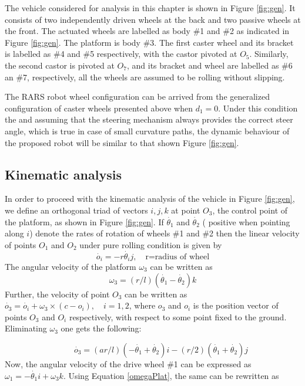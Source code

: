  The vehicle considered for analysis in this chapter is shown in Figure \ref{fig:gen}. It consists of two independently driven wheels at the back and two passive wheels at the front. The actuated wheels are labelled as body \#1 and \#2 as indicated in Figure \ref{fig:gen}. The platform is body \#3. The first caster wheel and its bracket is labelled as \#4 and \#5 respectively, with the castor pivoted at $O_5$. Similarly, the second castor is pivoted at $O_7$, and its bracket and wheel are labelled as \#6 an \#7, respectively, all the wheels are assumed to be rolling without slipping.  
 
 The RARS robot wheel configuration can be arrived from the generalized configuration of caster wheels presented above when $d_1=0$. Under this condition the and assuming that the steering mechanism always provides the correct steer angle, which is true in case of small curvature paths, the dynamic behaviour of the proposed robot will be similar to that  shown Figure  \ref{fig:gen}.
\subsection{Kinematic analysis}
In order to proceed with the kinematic analysis of the vehicle in Figure \ref{fig:gen}, we define an orthogonal triad of vectors ${i,j,k}$ at point $O_3$, the control point of the platform, as shown in Figure \ref{fig:gen}. If $\dot{\theta_1}$ and $\dot{\theta_2}$ {( positive when pointing along $i$)} denote the rates of rotation of wheels \#1 and \#2 then the linear velocity of points $O_1$ and $O_2$ under pure rolling condition is given by 
\begin{equation}
\label{velO1}
{\dot{o_i}}=-r\dot{\theta_i}j, \quad \text{r=radius of wheel}
\end{equation}
The angular velocity of the platform $\omega_3$ can be written as 
\begin{equation}
\label{omegaPlat}
{\omega_3}=(r/l)(\dot{\theta_1}-\dot{\theta_2}){k}
\end{equation}
Further, the velocity of point $O_3$ can be written as
${\dot{o_3}=\dot{o_i}+\omega_3 \times (c-o_i)}, \quad i=1,2$, where $o_3 $ and $o_i$  is the position vector of points $O_3$ and $O_i$ respectively, with respect to some  point fixed to the ground. Eliminating $\omega_3$  one gets the following:

\begin{equation}
\label{velPlat}
 \quad \quad \dot{o_3}={(a r/l)(-\dot{\theta_1}+\dot{\theta_2})}i -(r/2)( \dot{\theta_1}+ \dot{\theta_2})j
\end{equation}
Now, the angular velocity of the drive wheel \#1 can be expressed as ${\omega_1}=-\dot{\theta_1}i+\omega_3k$. Using Equation \ref{omegaPlat}, the same can be rewritten as 

